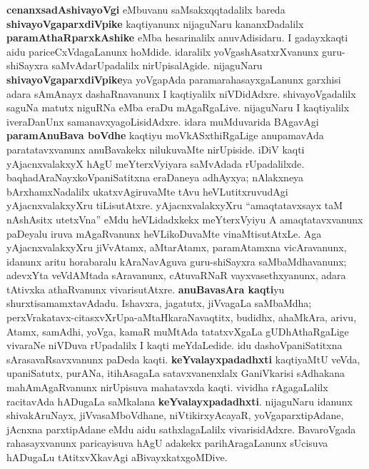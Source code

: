 \textbf{cenanxsadAshivayoVgi} eMbuvanu saMsakxqqtadalilx bareda \textbf{shivayoVgaparxdiVpike} kaqtiyanunx nijaguNaru kananxDadalilx \textbf{paramAthaRparxkAshike} eMba hesarinalilx anuvAdisidaru. I gadayxkaqti aidu pariceCxVdagaLanunx hoMdide. idaralilx yoVgashAsatxrXvanunx guru-shiSayxra saMvAda\-rUpadalilx nirUpisalAgide. nijaguNaru \textbf{shivayoVgaparxdiVpike}ya yoVgapAda paramarahasayxgaLanunx garxhisi adara sAmAnayx dashaRna\-vanunx I kaqtiyalilx niVDidAdxre. shivayoVgadalilx saguNa matutx niguRNa eMba eraDu mAgaRgaLive. nijaguNaru I kaqtiyalilx iveraDanUnx samanavxyagoLisidAdxre. idara muMduvarida BAga\-vAgi \textbf{paramAnuBava boVdhe} kaqtiyu moVkASxthiRgaLige anu\-pama\-vAda paratatavxvanunx anuBavakekx nilukuvaMte nirUpiside. iDiV kaqti yAjacnxvalakxyX hAgU meYterxVyiyara saMvAdada rUpadalilxde. baqhadAraNayxkoVpaniSatitxna eraDaneya adhAyxya; nAlakxneya bArxhamxNadalilx ukatxvAgiruvaMte tAvu heVLutitxruvudAgi yAjacnxvalakxyXru tiLisutAtxre. yAjacnxvalakxyXru ``amaqtatavxsayx taM nAshAsitx utetxVna'' eMdu heVLidadxkekx meYterxVyiyu A amaqtatavxvanunx paDeyalu iruva mAgaRvanunx heVLikoDuvaMte vinaMtisutAtxLe. Aga yAjacnxvalakxyXru jiVvAtamx, aMtarAtamx, paramAtamxna vicAravanunx, idanunx aritu horabaralu kAraNavAguva guru-shiSayxra saMbaMdhavanunx; adevxYta veVdAMtada sAravanunx, cAtuvaRNaR vayxvasethxyanunx, adara tAtivxka athaRvanunx vivarisutAtxre. \textbf{anuBavasAra kaqti}yu shurxtisamamxtavAdadu. Ishavxra, jagatutx, jiVvagaLa saMbaMdha; perxVrakatavx-citasxvXrUpa-\-aMtaHkaraNavaqtitx, budidhx, ahaMkAra, arivu, Atamx, samAdhi, yoVga, kamaR muMtAda tatatxvXgaLa gUDhAthaRgaLige vivaraNe niVDuva rUpadalilx I kaqti meYdaLedide. idu dashoVpaniSatitxna sArasavaRsavxvanunx paDeda kaqti. \textbf{keYvalayxpadadhxti} kaqtiyaMtU veVda, upaniSatutx, purANa, itihAsagaLa satavxvanenxlalx GaniVkarisi sAdhakana mahAmAgaRvanunx nirUpisuva mahatavxda kaqti. vividha rAgagaLalilx racitavAda hADugaLa saMkalana \textbf{keYvalayxpadadhxti}. nijaguNaru idanunx shivakAruNayx, jiVvasaMboVdhane, niVtikirxyAcayaR, yoVgaparxtipAdane, jAcnxna parxtipAdane eMdu aidu sathxlagaLalilx vivarisidAdxre. BavaroVgada rahasayxvanunx paricayisuva hAgU adakekx parihAragaLanunx sUcisuva hADugaLu tAtitxvXkavAgi aBivayxkatxgoMDive.

